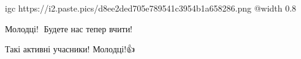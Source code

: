  
 
 
 
 

\qqSecCmt


\ifcmt
  igc https://i2.paste.pics/d8ee2ded705e789541c3954b1a658286.png
	@width 0.8
\fi


Молодці!👏 Будете нас тепер вчити!


Такі активні учасники! Молодці!👍
